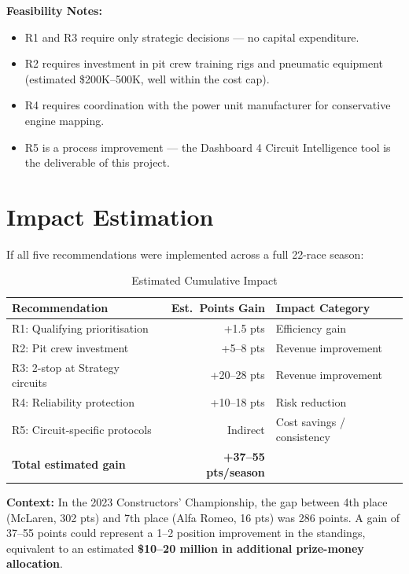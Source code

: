 \documentclass[12pt, a4paper]{article}
\begin{document}
\textbf{Feasibility Notes:}
\begin{itemize}[noitemsep]
    \item R1 and R3 require only strategic decisions --- no capital expenditure.
    \item R2 requires investment in pit crew training rigs and pneumatic equipment (estimated \$200K--500K, well within the cost cap).
    \item R4 requires coordination with the power unit manufacturer for conservative engine mapping.
    \item R5 is a process improvement --- the Dashboard 4 Circuit Intelligence tool is the deliverable of this project.
\end{itemize}

\newpage

\section{Impact Estimation}

If all five recommendations were implemented across a full 22-race season:

\begin{table}[H]
\centering
\caption{Estimated Cumulative Impact}
\begin{tabular}{l r l}
\toprule
\textbf{Recommendation} & \textbf{Est.\ Points Gain} & \textbf{Impact Category} \\
\midrule
R1: Qualifying prioritisation    & +1.5 pts   & Efficiency gain \\
R2: Pit crew investment          & +5--8 pts  & Revenue improvement \\
R3: 2-stop at Strategy circuits  & +20--28 pts & Revenue improvement \\
R4: Reliability protection       & +10--18 pts & Risk reduction \\
R5: Circuit-specific protocols   & Indirect   & Cost savings / consistency \\
\midrule
\textbf{Total estimated gain}    & \textbf{+37--55 pts/season} & \\
\bottomrule
\end{tabular}
\end{table}

\textbf{Context:} In the 2023 Constructors' Championship, the gap between 4th place (McLaren, 302 pts) and 7th place (Alfa Romeo, 16 pts) was 286 points. A gain of 37--55 points could represent a 1--2 position improvement in the standings, equivalent to an estimated \textbf{\$10--20 million in additional prize-money allocation}.
\end{document}
